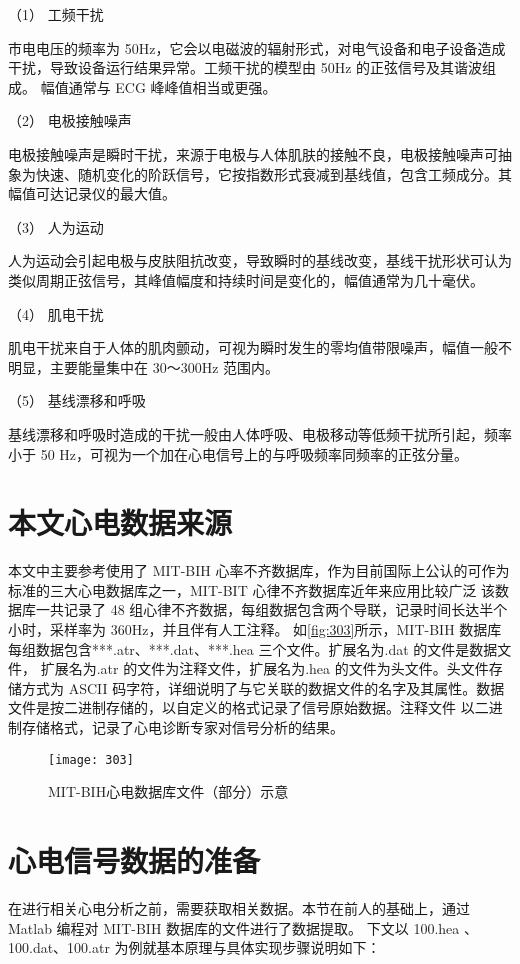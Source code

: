 （1）	工频干扰 

市电电压的频率为 50Hz，它会以电磁波的辐射形式，对电气设备和电子设备造成干扰，导致设备运行结果异常。工频干扰的模型由 50Hz 的正弦信号及其谐波组成。
幅值通常与 ECG 峰峰值相当或更强。 

（2）	电极接触噪声 

电极接触噪声是瞬时干扰，来源于电极与人体肌肤的接触不良，电极接触噪声可抽象为快速、随机变化的阶跃信号，它按指数形式衰减到基线值，包含工频成分。其幅值可达记录仪的最大值。 

（3）	人为运动 

人为运动会引起电极与皮肤阻抗改变，导致瞬时的基线改变，基线干扰形状可认为类似周期正弦信号，其峰值幅度和持续时间是变化的，幅值通常为几十毫伏。 

（4）	肌电干扰 

肌电干扰来自于人体的肌肉颤动，可视为瞬时发生的零均值带限噪声，幅值一般不明显，主要能量集中在 30～300Hz 范围内。 

（5）	基线漂移和呼吸 

基线漂移和呼吸时造成的干扰一般由人体呼吸、电极移动等低频干扰所引起，频率小于 50 Hz，可视为一个加在心电信号上的与呼吸频率同频率的正弦分量。 

\section{本文心电数据来源}

本文中主要参考使用了 MIT-BIH 心率不齐数据库，作为目前国际上公认的可作为标准的三大心电数据库之一，MIT-BIT 心律不齐数据库近年来应用比较广泛
该数据库一共记录了 48 组心律不齐数据，每组数据包含两个导联，记录时间长达半个小时，采样率为 360Hz，并且伴有人工注释。 
如\autoref{fig:303}所示，MIT-BIH 数据库每组数据包含***.atr、***.dat、***.hea 三个文件。扩展名为.dat 的文件是数据文件，
扩展名为.atr 的文件为注释文件，扩展名为.hea 的文件为头文件。头文件存储方式为 ASCII 码字符，详细说明了与它关联的数据文件的名字及其属性。数据文件是按二进制存储的，以自定义的格式记录了信号原始数据。注释文件
以二进制存储格式，记录了心电诊断专家对信号分析的结果。 
\begin{figure}[htbp]
    \centering
    \texttt{[image: 303]}
    \caption{\label{fig:303}MIT-BIH心电数据库文件（部分）示意 }
\end{figure}

\section{心电信号数据的准备 }
在进行相关心电分析之前，需要获取相关数据。本节在前人的基础上\cite{10}，通过 Matlab 编程对 MIT-BIH 数据库的文件进行了数据提取。
下文以 100.hea 、100.dat、100.atr 为例就基本原理与具体实现步骤说明如下： 


